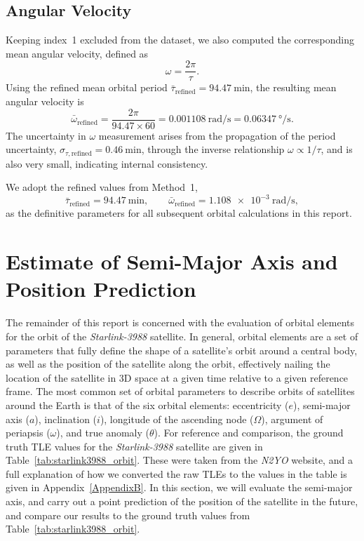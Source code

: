 \documentclass{article}
\begin{document}
\subsection{Angular Velocity}

Keeping index~1 excluded from the dataset, we also computed the corresponding mean angular velocity, defined as \[ \omega = \frac{2\pi}{\tau}. \] Using the refined mean orbital period $\bar{\tau}_{\text{refined}} = \SI{94.47}{\minute}$, the resulting mean angular velocity is \[ \bar{\omega}_{\text{refined}} = \frac{2\pi}{94.47\times60} = \SI{0.001108}{\radian\per\second} = \SI{0.06347}{\degree\per\second}. \] The uncertainty in $\omega$ measurement arises from the propagation of the period uncertainty, $\sigma_{\tau,\text{refined}} = \SI{0.46}{\minute}$, through the inverse relationship $\omega \propto 1/\tau$, and is also very small, indicating internal consistency.

We adopt the refined values from Method~1,
\[
    \bar{\tau}_{\text{refined}} = \SI{94.47}{\minute}, \qquad 
    \bar{\omega}_{\text{refined}} = \SI{1.108e-3}{\radian\per\second},
\]
as the definitive parameters for all subsequent orbital calculations in this report.

\section{Estimate of Semi-Major Axis and Position Prediction}

The remainder of this report is concerned with the evaluation of orbital elements for the orbit of the \textit{Starlink-3988} satellite. In general, orbital elements are a set of parameters that fully define the shape of a satellite's orbit around a central body, as well as the position of the satellite along the orbit, effectively nailing the location of the satellite in 3D space at a given time relative to a given reference frame. The most common set of orbital parameters to describe orbits of satellites around the Earth is that of the six orbital elements: eccentricity ($e$), semi-major axis ($a$), inclination ($i$), longitude of the ascending node ($\Omega$), argument of periapsis ($\omega$), and true anomaly ($\theta$). For reference and comparison, the ground truth TLE values for the \textit{Starlink-3988} satellite are given in Table~\ref{tab:starlink3988_orbit}. These were taken from the \textit{N2YO} website, and a full explanation of how we converted the raw TLEs to the values in the table is given in Appendix~\ref{AppendixB}. In this section, we will evaluate the semi-major axis, and carry out a point prediction of the position of the satellite in the future, and compare our results to the ground truth values from Table~\ref{tab:starlink3988_orbit}.
\end{document}
